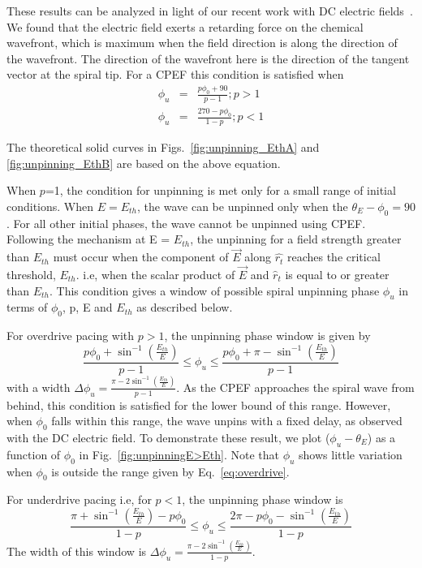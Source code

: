 These results can be analyzed in light of our recent work with DC
electric fields~\cite{Amrutha}. We found that the electric field exerts a
retarding force on the chemical wavefront, which is maximum when the
field direction is along the direction of the wavefront. The direction of the
wavefront here is the direction of the tangent vector at the spiral tip. For a
CPEF this condition is satisfied when 
\begin{eqnarray}
	\phi_u &=& \frac{p \phi_0+ 90}{p-1} ; p>1 \\
	\phi_u &=& \frac{270-p \phi_0}{1-p} ; p<1  
\label{eq:Eth}
\end{eqnarray}

The theoretical solid curves in Figs.~\ref{fig:unpinning_EthA} and
\ref{fig:unpinning_EthB} are based on the above equation.   

When $p$=1, the condition for unpinning is met only for a small range of initial
conditions. When $E=E_{th}$, the wave can be unpinned only when the
$\theta_E-\phi_0 = 90$. For all other initial phases, the wave cannot be unpinned using CPEF.  
Following the mechanism at E = $E_{th}$, the unpinning for a field strength
greater than $E_{th}$ must occur when the component of $\vec{E}$ along
$\hat{r_t}$ reaches the critical threshold, $E_{th}$. i.e, when the scalar
product of ${\vec{E}}$ and ${\hat{r}}_{t}$ is equal to or greater than
$E_{th}$. This condition gives a window of possible spiral unpinning phase
$\phi_{u}$ in terms of $\phi_{0}$, p, E and $E_{th}$ as described below.

For overdrive pacing with $p>1$, the unpinning phase window is given by
\begin{equation}
\frac{p \phi_0+ {\sin^{-1}}(\frac{E_{th}}{E})}{p-1}   \leq \phi_u \leq \frac{p \phi_0+\pi -{\sin^{-1}}(\frac{E_{th}}{E})}{p-1}
\label{eq:overdrive}
\end{equation}
with a width $\Delta\phi_u = \frac{\pi - 2 \sin^{-1}(\frac{E_{th}}{E})}{p-1}$.
As the CPEF approaches the spiral wave from behind, this condition is satisfied for the lower bound of this range. However, when $\phi_0$ falls within this range, the wave unpins with a fixed delay, as observed with the DC electric field. To demonstrate these result, we plot ($\phi_u-\theta_E$) as a function of $\phi_0$ in Fig.~\ref{fig:unpinningE>Eth}. Note that $\phi_u$  shows little variation when $\phi_0$ is outside the range given by Eq.~\ref{eq:overdrive}.

For underdrive pacing i.e, for $p<1$, the unpinning phase window is 
\begin{equation}
\frac{\pi+ {\sin^{-1}}(\frac{E_{th}}{E})-p \phi_0}{1-p}   \leq \phi_u \leq \frac{2\pi-p \phi_0-{\sin^{-1}}(\frac{E_{th}}{E})}{1-p}
\label{eq:underdrive}
\end{equation}
The width of this window is $\Delta\phi_u = \frac{\pi - 2 \sin^{-1}(\frac{E_{th}}{E})}{1-p}$. 


